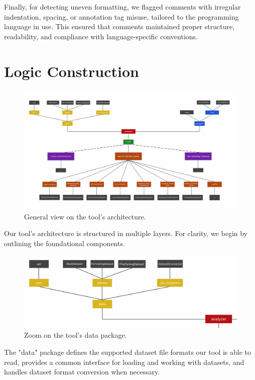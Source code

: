 \noindent Finally, for detecting uneven formatting, we flagged comments with irregular indentation, spacing, or annotation tag misuse, tailored to the programming language in use. This ensured that comments maintained proper structure, readability, and compliance with language-specific conventions.

\section{Logic Construction}

\begin{figure}[ht]
	\centering\includegraphics[width=400pt]{figs/whole-architecture.PNG}
	\captionsetup{justification=centering}
	\caption{General view on the tool's architecture.}
	\label{fig:whole-architecture}
\end{figure}

\noindent Our tool's architecture is structured in multiple layers. For clarity, we begin by outlining the foundational components.

\begin{figure}[ht]
	\centering\includegraphics[width=400pt]{figs/zoom-data.PNG}
	\captionsetup{justification=centering}
	\caption{Zoom on the tool's data package.}
	\label{fig:zoom-data}
\end{figure}

\noindent The "data" package defines the supported dataset file formats our tool is able to read, provides a common interface for loading and working with datasets, and handles dataset format conversion when necessary.

